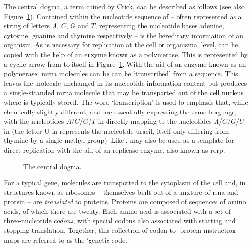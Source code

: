 \documentclass[thesis.tex]{subfiles}
\begin{document}
The central dogma, a term coined by Crick, can be described as follows (see also Figure~\ref{fig:central_dogma}). Contained within the nucleotide sequence of  -- often represented as a string of letters $A$, $C$, $G$ and $T$,  representing the nucleotide bases adenine, cytosine, guanine and thymine respectively -- is the hereditary information of an organism. As is necessary for replication at the cell or organismal level,  can be copied with the help of an enzyme known as a  polymerase. This is represented by a cyclic arrow from  to itself in Figure~\ref{fig:central_dogma}. With the aid of an enzyme known as an  polymerase, \gls{mrna} molecules can be can be `transcribed' from a  sequence. This leaves the  molecule unchanged in its nucleotide information content but produces a single-stranded \gls{mrna} molecule that may be transported out of the cell nucleus where  is typically stored. The word `transcription' is used to emphasis that, while chemically slightly different,  and  are essentially expressing the same language, with the nucleotides $A$/$C$/$G$/$T$ in  directly mapping to the nucleotides $A$/$C$/$G$/$U$ in  (the letter U in represents the nucleotide uracil, itself only differing from thymine by a single methyl group). Like ,  may also be used as a template for direct replication with the aid of an  replicase enzyme, also known as \gls{rdrp}.

\begin{figure}[htbp]
\centering
{}
\caption{The central dogma.\label{fig:central_dogma}}
\end{figure}

For a typical gene,  molecules are transported to the cytoplasm of the cell and, in structures known as ribosomes -- themselves built out of a mixture of \gls{rrna} and protein -- are \emph{translated} to proteins. Proteins are composed of sequences of amino acids, of which there are twenty. Each amino acid is associated with a set of three-nucleotide \emph{codons}, with special codons also associated with starting and stopping translation. Together, this collection of codon-to -protein-instruction maps are referred to as the `genetic code'.
\end{document}
